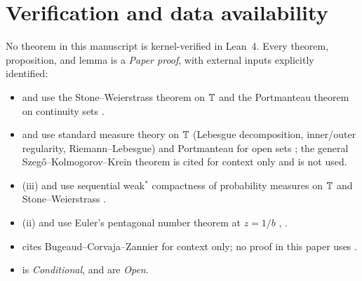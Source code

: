 \documentclass[11pt]{article}
\begin{document}
\section{Verification and data availability}\label{sec:verification}

No theorem in this manuscript is kernel-verified in Lean~4. Every theorem, proposition, and lemma is a \emph{Paper proof}, with external inputs explicitly identified:
\begin{itemize}[nosep]
\item {} and  use the Stone--Weierstrass theorem on $\mathbb T$ \cite{Rudin76} and the Portmanteau theorem on continuity sets \cite{Billingsley99}.
\item {} and  use standard measure theory on $\mathbb T$ (Lebesgue decomposition, inner/outer regularity, Riemann--Lebesgue) and Portmanteau for open sets \cite{Billingsley99}; the general Szeg\H{o}--Kolmogorov--Krein theorem \cite{GrenanderSzego58,Simon05} is cited for context only and is not used.
\item {}(iii) and  use sequential weak$^*$ compactness of probability measures on $\mathbb T$ \cite{Billingsley99} and Stone--Weierstrass \cite{Rudin76}.
\item {}(ii) and  use Euler's pentagonal number theorem at $z=1/b$ \cite[Chapter~1]{Andrews1976}, \cite{EulerE541}.
\item {} cites Bugeaud--Corvaja--Zannier \cite{BCZ03} for context only; no proof in this paper uses \cite{BCZ03}.
\item {} is \emph{Conditional}, and  are \emph{Open}.
\end{itemize}
\end{document}
